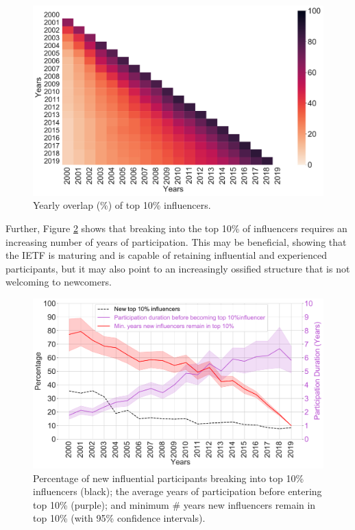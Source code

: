 \documentclass[twocolumn,10pt]{article}
\newlength{\figureWidthOneColumn}
\begin{document}
\begin{figure}
  \centering
  \includegraphics[width=\figureWidthOneColumn]{figures-prev/icwsm-2022/heatmap_top10_percent_overlap.pdf}
  \caption{
    Yearly overlap (\%) of top 10\% influencers.
  }
  \label{fig:heatmap_top10_overlap}
\end{figure}

Further, Figure \ref{fig:rate_new_influential_participants} shows that
breaking into the top 10\% of influencers requires an increasing number of
years of participation. This may be beneficial, showing that the IETF is
maturing and is capable of retaining influential and experienced
participants, but it may also point to an increasingly ossified structure
that is not welcoming to newcomers.

\begin{figure}
  \centering
  \includegraphics[width=\figureWidthOneColumn]{figures-prev/icwsm-2022/new_influencers_top10_age_longevityInTop10.pdf}
  \caption{
    Percentage of new influential participants breaking into top 10\%
    influencers (black); the average years of participation before entering
    top 10\% (purple); and minimum \#  years new influencers remain in top
    10\% (with 95\% confidence intervals).
  }
  \label{fig:rate_new_influential_participants}
\end{figure}
\end{document}
